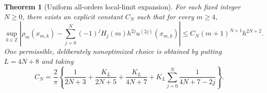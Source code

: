 \documentclass[11pt,a4paper,oneside,openany]{book}
\numberwithin{equation}{chapter}
\newtheorem{theorem}{Theorem}[chapter]
\theoremstyle{definition}
\theoremstyle{remark}
\newcommand{\Z}{\mathbb Z}
\begin{document}
\begin{theorem}[Uniform all-orders local-limit expansion]\label{rs:thm:local-limit}
For each fixed integer $N\geq0$, there exists an explicit constant
$C_N$ such that for every $m\geq4$,
\begin{equation}
 \boxed{
 \sup_{k\in\Z}\left|
 \rho_m(x_{m,k})-
 \sum_{j=0}^N(-1)^jH_j(m)h^{2j}u^{(2j)}(x_{m,k})
 \right|
 \leq C_N(m+1)^{N+1}h^{2N+2}.}
 \label{rs:eq:uniform-local-limit}
\end{equation}
One permissible, deliberately nonoptimized choice is obtained by
putting $L=4N+8$ and taking
\begin{equation}
 C_N=\frac2\pi\left\{
 \frac1{2N+3}+\frac{K_L}{2N+5}
 +\frac{K_L}{4N+7}
 +K_L\sum_{j=0}^N\frac1{4N+7-2j}
 \right\}.
 \label{rs:eq:CN-explicit}
\end{equation}
\end{theorem}
\end{document}
